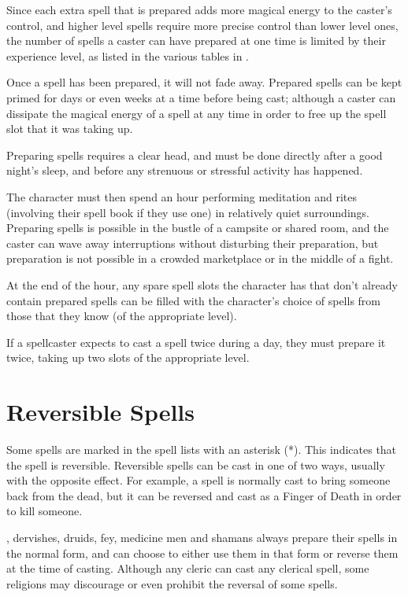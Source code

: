 \begin{multicols*}{2}
Since each extra spell that is prepared adds more magical energy to the caster’s control, and higher level spells require more precise control than lower level ones, the number of spells a caster can have prepared at one time is limited by their experience level, as listed in the various tables in .

Once a spell has been prepared, it will not fade away. Prepared spells can be kept primed for days or even weeks at a time before being cast; although a caster can dissipate the magical energy of a spell at any time in order to free up the spell slot that it was taking up.

Preparing spells requires a clear head, and must be done directly after a good night’s sleep, and before any strenuous or stressful activity has happened.

The character must then spend an hour performing meditation and rites (involving their spell book if they use one) in relatively quiet surroundings. Preparing spells is possible in the bustle of a campsite or shared room, and the caster can wave away interruptions without disturbing their preparation, but preparation is not possible in a crowded marketplace or in the middle of a fight.

At the end of the hour, any spare spell slots the character has that don’t already contain prepared spells can be filled with the character’s choice of spells from those that they know (of the appropriate level).

If a spellcaster expects to cast a spell twice during a day, they must prepare it twice, taking up two slots of the appropriate level.

\section{Reversible Spells}
Some spells are marked in the spell lists with an asterisk (*). This indicates that the spell is reversible. Reversible spells can be cast in one of two ways, usually with the opposite effect. For example, a  spell is normally cast to bring someone back from the dead, but it can be reversed and cast as a Finger of Death in order to kill someone.

, dervishes, druids, fey, medicine men and shamans always prepare their spells in the normal form, and can choose to either use them in that form or reverse them at the time of casting. Although any cleric can cast any clerical spell, some religions may discourage or even prohibit the reversal of some spells.


\end{multicols*}

